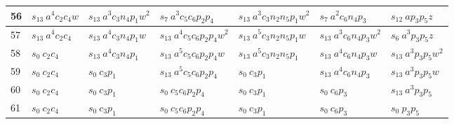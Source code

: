 \documentclass[preliminary,copyright,creativecommons]{eptcs}
\newcommand{\myway}[1]{\raisebox{-4pt}{\rule{0pt}{16pt}}\colorbox[rgb]{.7,.7,.7}{#1}}
\theoremstyle{remark}
\begin{document}
\begin{table}[h]
\begin{center}
\begin{tabular}{ | l | l | l | l | l | l | l | }
56 & $s_{13}~ a^{4}c_2c_4w$ & $s_{13}~ a^{3}c_3n_4p_1w^{2}$ & $s_7~ a^{3}c_5c_6p_2p_4$ & $s_{13}~ a^{3}c_3n_2n_5p_1w^{2}$ & $s_7~ a^{2}c_6n_4p_3$ & $s_{12}~ ap_3p_5z$ \\ \hline
57 & $s_{13}~ a^{4}c_2c_4$ & $s_{13}~ a^{4}c_3n_4p_1w$ & $s_{13}~ a^{4}c_5c_6p_2p_4w^{2}$ & $s_{13}~ a^{5}c_3n_2n_5p_1w$ & $s_{13}~ a^{3}c_6n_4p_3w^{2}$ & $s_6~ a^{3}p_3p_5z$ \\ \hline
58 & $s_0~ c_2c_4$ & $s_{13}~ a^{4}c_3n_4p_1$ & $s_{13}~ a^{5}c_5c_6p_2p_4w$ & $s_{13}~ a^{5}c_3n_2n_5p_1$ & $s_{13}~ a^{4}c_6n_4p_3w$ & $s_{13}~ a^{3}p_3p_5w^{2}$ \\ \hline
59 & $s_0~ c_2c_4$ & $s_0~ c_3p_1$ & $s_{13}~ a^{5}c_5c_6p_2p_4$ & $s_0~ c_3p_1$ & $s_{13}~ a^{4}c_6n_4p_3$ & $s_{13}~ a^{3}p_3p_5w$ \\ \hline
60 & $s_0~ c_2c_4$ & $s_0~ c_3p_1$ & $s_0~ c_5c_6p_2p_4$ & $s_0~ c_3p_1$ & $s_0~ c_6p_3$ & $s_{13}~ a^{3}p_3p_5$ \\ \hline
61 & \myway{$s_0~ c_2c_4$} & \myway{$s_0~ c_3p_1$} & \myway{$s_0~ c_5c_6p_2p_4$} & \myway{$s_0~ c_3p_1$} & \myway{$s_0~ c_6p_3$} & \myway{$s_0~ p_3p_5$} \\ \hline
\end{tabular}
\end{center}
\end{table}
\end{document}
